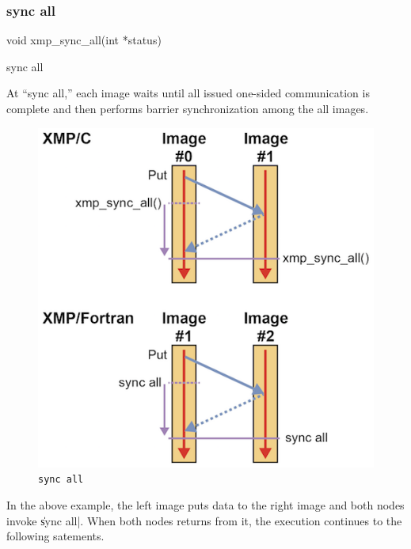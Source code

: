 \subsubsection{sync all}


\begin{XCexample}
void xmp_sync_all(int *status)
\end{XCexample}

\begin{XFexample}
sync all
\end{XFexample}

At ``sync all,'' each image waits until all issued one-sided
communication is complete and then performs barrier synchronization
among the all images.

\begin{figure}
  \centering
  \includegraphics[width=\textwidth]{figs/sync_all.png}
  \caption{{\tt sync all}}
\end{figure}

In the above example, the left image puts data to the right image and
both nodes invoke \|sync all|. When both nodes returns from it, the
execution continues to the following satements.

